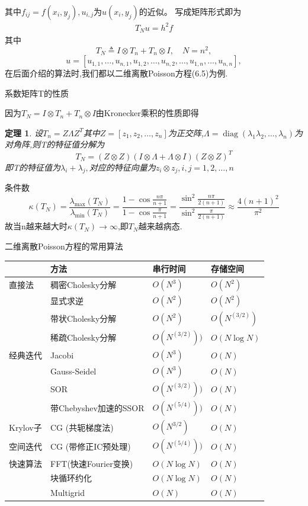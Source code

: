 \documentclass[notheorems,serif]{beamer}
\renewcommand{\normalsize}{\wuhao}
\newcommand{\wuhao}{\fontsize{10.5pt}{\baselineskip}\selectfont}
\newcommand{\hei}[1]{{\HEI#1}}
\newtheorem{theorem}{\hei{定理}}
\begin{document}
\begin{frame}
其中$f_{i j}=f\left(x_{i}, y_{j}\right), u_{i, j}$为$u\left(x_{i}, y_{j}\right)$的近似。
写成矩阵形式即为
\begin{align}
T_{N} u=h^{2} f
\tag{6.5}
\end{align}
其中
$$
T_{N} \triangleq I \otimes T_{n}+T_{n} \otimes I, \quad N=n^{2},
$$
$$
u=\left[u_{1,1}, \ldots, u_{n, 1}, u_{1,2}, \ldots, u_{n, 2}, \ldots, u_{1, n}, \ldots, u_{n, n}\right],
$$
在后面介绍的算法时,我们都以二维离散Poisson方程({\color{blue}6.5})为例.
\end{frame}  

\begin{frame}
\Large {\color{blue}系数矩阵T的性质}

\normalsize
因为$T_{N}=I \otimes T_{n}+T_{n} \otimes I$由Kronecker乘积的性质即得

\begin{theorem}
设$T_{n}=Z \Lambda Z^{T}$其中$Z=\left[z_{1}, z_{2}, \ldots, z_{n}\right]$为正交阵,$\Lambda=\operatorname{diag}\left(\lambda_{1}\lambda_{2}, \dots, \lambda_{n} \right)$为对角阵,则T的特征值分解为
$$
T_{N}=(Z \otimes Z)(I \otimes \Lambda+\Lambda \otimes I)(Z \otimes Z)^{T}
$$
即T的特征值为$\lambda_{i}+\lambda_{j},$对应的特征向量为$ z_{i} \otimes z_{j}, i, j=1,2, \dots, n$
\end{theorem}
条件数
$$
\kappa\left(T_{N}\right)=\frac{\lambda_{\max }\left(T_{N}\right)}{\lambda_{\min }\left(T_{N}\right)}=\frac{1-\cos \frac{n \pi}{n+1}}{1-\cos \frac{\pi}{n+1}}=\frac{\sin ^{2} \frac{n \pi}{2(n+1)}}{\sin ^{2} \frac{\pi}{2(n+1)}} \approx \frac{4(n+1)^{2}}{\pi^{2}}
$$
故当n越来越大时$\kappa\left(T_{N}\right) \rightarrow \infty$,即$T_N$越来越病态.
\end{frame}

\begin{frame}
{二维离散Poisson方程的常用算法}
\normalsize
\begin{tabular}{l|lll}
\hline
{}&方法&串行时间&存储空间\\
\hline
\hline
直接法&稠密Cholesky分解&$O(N^3)$&$O(N^2)$\\
{}&显式求逆&$O(N^2)$&$O(N^2)$\\
{}&带状Cholesky分解&$O(N^2)$&$O(N^(3/2))$\\
{}&稀疏Cholesky分解&$O(N^(3/2)))$&$O(N\log N)$\\
\hline
经典迭代&Jacobi&$O(N^3)$&$O(N)$\\
{}&Gauss-Seidel&$O(N^3)$&$O(N)$\\
{}&SOR&$O(N^(3/2)))$&$O(N)$\\
{}& 带Chebyshev加速的SSOR &$O(N^(5/4)))$&$O(N)$\\
\hline
Krylov子&CG (共轭梯度法)&$O(N^{3/2})$&$O(N)$\\
空间迭代&CG (带修正IC预处理)&$O(N^(5/4)))$&$O(N)$\\
\hline
快速算法&FFT(快速Fourier变换)&$O(N\log N)$&$O(N)$\\
{}&块循环约化&$O(N\log N)$&$O(N)$\\
{}&Multigrid&$O(N)$&$O(N)$\\
\hline
\end{tabular}
\end{frame}
\end{document}
